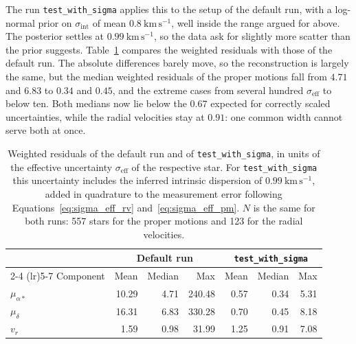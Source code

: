 The run \texttt{test\_with\_sigma} applies this to the setup of the default run, with a log-normal prior on
$\sigma_\mathrm{int}$ of mean $0.8~\mathrm{km\,s^{-1}}$, well inside the range argued for above. The
posterior settles at $0.99~\mathrm{km\,s^{-1}}$, so the data ask for slightly more scatter than the prior
suggests. Table~\ref{tab:residuals_sigma} compares the weighted residuals with those of the default run.
The absolute differences barely move, so the reconstruction is largely the same, but the median weighted
residuals of the proper motions fall from $4.71$ and $6.83$ to $0.34$ and $0.45$, and the extreme cases
from several hundred $\sigma_\mathrm{eff}$ to below ten. Both medians now lie below the $0.67$ expected
for correctly scaled uncertainties, while the radial velocities stay at $0.91$: one common width cannot
serve both at once.

\begin{table}[h!]
    \centering
    \caption{Weighted residuals of the default run and of \texttt{test\_with\_sigma}, in units of the
    effective uncertainty $\sigma_\mathrm{eff}$ of the respective star. For \texttt{test\_with\_sigma}
    this uncertainty includes the inferred intrinsic dispersion of $0.99~\mathrm{km\,s^{-1}}$, added in
    quadrature to the measurement error following Equations~\ref{eq:sigma_eff_rv}
    and~\ref{eq:sigma_eff_pm}. $N$ is the same for both runs: 557 stars for the proper motions and 123
    for the radial velocities.}
    \label{tab:residuals_sigma}
    \begin{tabular}{l r r r r r r}
        \toprule
                        & \multicolumn{3}{c}{Default run} & \multicolumn{3}{c}{\texttt{test\_with\_sigma}}                                 \\
        \cmidrule(lr){2-4} \cmidrule(lr){5-7}
        Component       & Mean                            & Median                                         & Max    & Mean & Median & Max  \\
        \midrule
        $\mu_{\alpha*}$ & 10.29                           & 4.71                                           & 240.48 & 0.57 & 0.34   & 5.31 \\
        $\mu_{\delta}$  & 16.31                           & 6.83                                           & 330.28 & 0.70 & 0.45   & 8.18 \\
        $v_r$           & 1.59                            & 0.98                                           & 31.99  & 1.25 & 0.91   & 7.08 \\
        \bottomrule
    \end{tabular}
\end{table}

